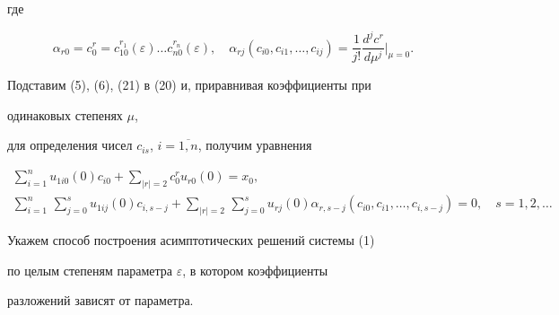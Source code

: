где


$$


\alpha_{r0}=c^{r}_{0}=c^{r_{1}}_{10}(\varepsilon)\dotsc


c^{r_{n}}_{n0}(\varepsilon),\quad \alpha_{rj} (c_{i0},c_{i1},\dotsc,


c_{ij})=\frac{1}{j!}\frac{d^{j}c^{r}}{d\mu^{j}}\Big|_{\mu=0}.


$$


Подставим (5), (6), (21) в (20) и, приравнивая коэффициенты при


одинаковых степенях $\mu$,


для определения чисел $c_{is}$, $i=\overline{1,n}$, получим уравнения


\begin{gather*}


\sum_{i=1}^{n}u_{1i0}(0)c_{i0}+\sum_{|r|=2}c^{r}_{0}u_{r0}(0)=x_{0},\\


%


\sum_{i=1}^{n}\,\sum_{j=0}^{s}u_{1ij}(0)c_{i,s-j}+


\sum_{|r|=2}\,\sum_{j=0}^{s}u_{rj}(0)\alpha_{r,s-j}


(c_{i0},c_{i1},\dotsc, c_{i,s-j})=0,\quad s=1,2,\dotsc


\end{gather*}





Укажем способ построения асимптотических решений системы (1)


по целым степеням параметра $\varepsilon$, в котором коэффициенты


разложений зависят от параметра.








